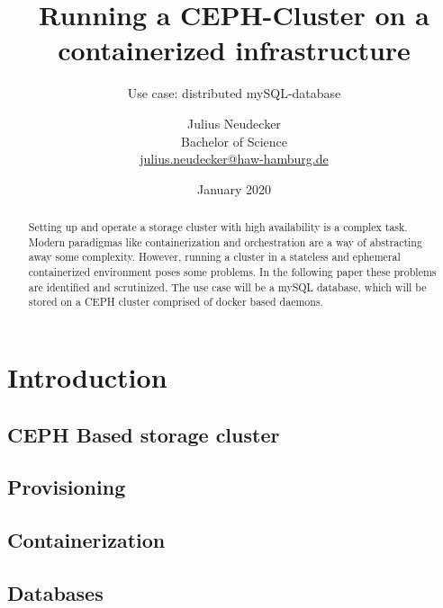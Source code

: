 \documentclass[titlepage, a4paper, 11pt]{scrartcl}
\title{Running a CEPH-Cluster on a containerized infrastructure}
\subtitle{Use case: distributed mySQL-database}
\author{Julius Neudecker \\ Bachelor of Science \\ \href{mailto:julius.neudecker@haw-hamburg.de}{julius.neudecker@haw-hamburg.de}}
\date{January 2020}
\begin{document}
    \maketitle

    \tableofcontents

    \begin{abstract}
        Setting up and operate a storage cluster with high availability is a complex task. Modern paradigmas like containerization
        and orchestration are a way of abstracting away some complexity. However, running a cluster in a stateless and ephemeral
        containerized environment poses some problems. In the following paper these problems are identified and scrutinized.
        The use case will be a mySQL database, which will be stored on a CEPH cluster comprised of docker based daemons.
    \end{abstract}

    \section{Introduction}




        \subsection{CEPH Based storage cluster}

        \subsection{Provisioning}

        \subsection{Containerization}

        \subsection{Databases}
\end{document}
